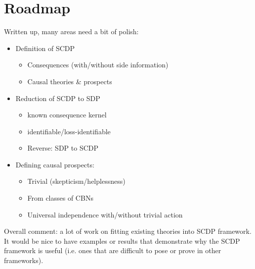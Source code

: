 \section{Roadmap}

Written up, many areas need a bit of polish:

\begin{itemize}
    \item Definition of SCDP
    \begin{itemize}
        \item Consequences (with/without side information)
        \item Causal theories \& prospects
    \end{itemize}
    \item Reduction of SCDP to SDP 
    \begin{itemize}
        \item known consequence kernel
        \item identifiable/loss-identifiable
        \item Reverse: SDP to SCDP
    \end{itemize}
    \item Defining causal prospects:
    \begin{itemize}
        \item Trivial (skepticism/helplessness)
        \item From classes of CBNs
        \item Universal independence with/without trivial action
    \end{itemize}
\end{itemize}


Overall comment: a lot of work on fitting existing theories into SCDP framework. It would be nice to have examples or results that demonstrate why the SCDP framework is useful (i.e. ones that are difficult to pose or prove in other frameworks).

